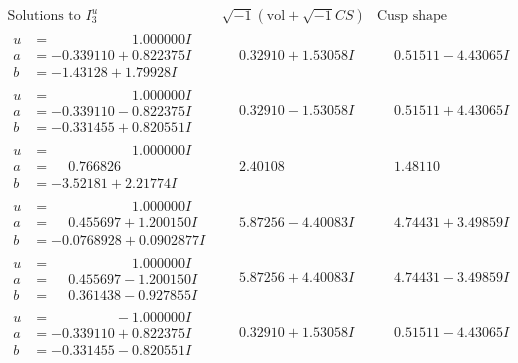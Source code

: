 \documentclass[1p]{elsarticle_modified}
\theoremstyle{definition}
\newcommand{\I}{\sqrt{-1}}
\begin{document}
$$\begin{array}{c|c|c}  
\text{Solutions to }I^u_{3}& \I (\text{vol} + \sqrt{-1}CS) & \text{Cusp shape}\\
 \hline 
\begin{aligned}
u &= \phantom{-0.000000 -}1.000000 I \\
a &= -0.339110 + 0.822375 I \\
b &= -1.43128 + 1.79928 I\end{aligned}
 & \phantom{-}0.32910 + 1.53058 I & \phantom{-}0.51511 - 4.43065 I \\ \hline\begin{aligned}
u &= \phantom{-0.000000 -}1.000000 I \\
a &= -0.339110 - 0.822375 I \\
b &= -0.331455 + 0.820551 I\end{aligned}
 & \phantom{-}0.32910 - 1.53058 I & \phantom{-}0.51511 + 4.43065 I \\ \hline\begin{aligned}
u &= \phantom{-0.000000 -}1.000000 I \\
a &= \phantom{-}0.766826\phantom{ +0.000000I} \\
b &= -3.52181 + 2.21774 I\end{aligned}
 & \phantom{-}2.40108\phantom{ +0.000000I} & \phantom{-}1.48110\phantom{ +0.000000I} \\ \hline\begin{aligned}
u &= \phantom{-0.000000 -}1.000000 I \\
a &= \phantom{-}0.455697 + 1.200150 I \\
b &= -0.0768928 + 0.0902877 I\end{aligned}
 & \phantom{-}5.87256 - 4.40083 I & \phantom{-}4.74431 + 3.49859 I \\ \hline\begin{aligned}
u &= \phantom{-0.000000 -}1.000000 I \\
a &= \phantom{-}0.455697 - 1.200150 I \\
b &= \phantom{-}0.361438 - 0.927855 I\end{aligned}
 & \phantom{-}5.87256 + 4.40083 I & \phantom{-}4.74431 - 3.49859 I \\ \hline\begin{aligned}
u &= \phantom{-0.000000 } -1.000000 I \\
a &= -0.339110 + 0.822375 I \\
b &= -0.331455 - 0.820551 I\end{aligned}
 & \phantom{-}0.32910 + 1.53058 I & \phantom{-}0.51511 - 4.43065 I \\ \hline\begin{aligned}

\end{aligned}
\end{array}$$
\end{document}
